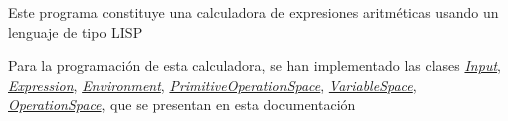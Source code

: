 Este programa constituye una calculadora de expresiones aritméticas usando un lenguaje de tipo L\+I\+SP

Para la programación de esta calculadora, se han implementado las clases {\itshape \hyperlink{class_input}{Input}}, {\itshape \hyperlink{class_expression}{Expression}}, {\itshape \hyperlink{class_environment}{Environment}}, {\itshape \hyperlink{class_primitive_operation_space}{Primitive\+Operation\+Space}}, {\itshape \hyperlink{class_variable_space}{Variable\+Space}}, {\itshape \hyperlink{class_operation_space}{Operation\+Space}}, que se presentan en esta documentación 